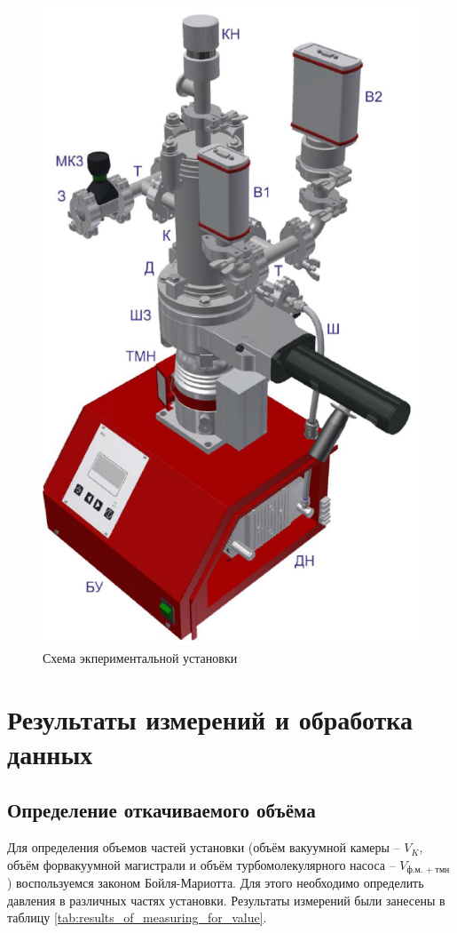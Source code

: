 \documentclass[a4paper, 12pt]{article}
\begin{document}
        \begin{figure}[H]
            \centering
            \includegraphics[scale = 0.8]{images/231_2.png}
            \caption{Схема экпериментальной установки}
        \end{figure}
        
    
    \section*{Результаты измерений и обработка данных}
        \subsection*{Определение откачиваемого объёма}
        Для определения объемов частей установки (объём вакуумной камеры -- $V_{K}$, объём форвакуумной магистрали и объём турбомолекулярного насоса -- $V_{\text{ф.м. + тмн}}$) воспользуемся законом Бойля-Мариотта. Для этого необходимо определить давления в различных частях установки. Результаты измерений были занесены в таблицу \ref{tab:results_of_measuring_for_value}.
	
\end{document}

